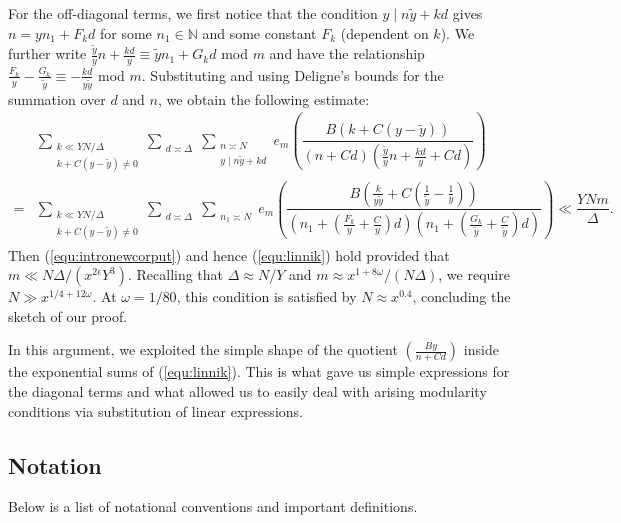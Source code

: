 \documentclass{amsart}
\numberwithin{equation}{section}
\begin{document}
\vspace{3mm} For the off-diagonal terms, we first notice that the condition $ y \mid n \widetilde{y}+kd$ gives $n = y n_1 + F_k d$ for some $n_1 \in \mathbb{N}$ and some constant $F_k$ (dependent on $k$). We further write $\frac{\widetilde{y}}{y}n + \frac{kd}{y} \equiv \widetilde{y} n_1 + G_k d$ mod $m$ and have the relationship $\frac{F_k}{y} - \frac{G_k}{\widetilde{y}} \equiv - \frac{kd}{y \widetilde{y}}$ mod $m$.  Substituting and using  Deligne's bounds for the summation over $d$ and $n$, we obtain the following estimate: 
\begin{align*} 
  &\sum_{\substack{ k \ll Y N/\Delta \\ k+C(y- \widetilde{y}) \neq 0}} \sum_{\substack{d \asymp \Delta}} \sum_{\substack{n\asymp N  \\  y \mid n \widetilde{y}+kd}}  e_{m}\left(\dfrac{B(k+C(y-\widetilde{y})) }{(n+Cd)(\frac{\widetilde{y}}{y}n + \frac{kd}{y}+Cd)}   \right) \\
  =  &\sum_{\substack{ k \ll Y N/\Delta \\ k+C(y- \widetilde{y}) \neq 0}} \sum_{\substack{d \asymp \Delta}} \sum_{\substack{n_1 \asymp N }}  e_{m}\left(\dfrac{B(\frac{k}{y \widetilde{y}}+C(\frac{1}{\widetilde{y}}-\frac{1}{y})) }{( n_1 + (\frac{F_k}{y} +\frac{C}{y})d)(n_1 + (\frac{G_k}{\widetilde{y}}+\frac{C}{\widetilde{y}})d)}   \right) \ll \dfrac{ Y N m   }{\Delta }. \nonumber
\end{align*}
Then (\ref{equ:intronewcorput}) and hence (\ref{equ:linnik}) hold provided that $m \ll  N \Delta/(x^{2\epsilon}Y^3)$. Recalling that $\Delta \approx N/Y$ and $m \approx x^{1+8\omega}/(N\Delta)$, we require $N \gg x^{1/4+12\omega}$. At $\omega = 1/80$, this condition is satisfied by $N \approx x^{0.4}$, concluding the sketch of our proof. 

\vspace{3mm} In this argument, we exploited the simple shape of the quotient $(\frac{B y }{n +Cd})$ inside the exponential sums of (\ref{equ:linnik}). This is what gave us simple expressions for the diagonal terms and what allowed us to easily deal with arising modularity conditions via substitution of linear expressions.




\subsection{Notation} Below is a list of notational conventions and important definitions.
\end{document}
